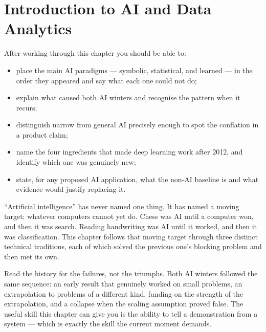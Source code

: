 
    \chapter{Introduction to AI and Data Analytics}

\label{ch:introduction}

\begin{learningobjectives}
After working through this chapter you should be able to:
\begin{itemize}
  \item place the main AI paradigms --- symbolic, statistical, and learned ---
        in the order they appeared and say what each one could not do;
  \item explain what caused both AI winters and recognise the pattern when it
        recurs;
  \item distinguish narrow from general AI precisely enough to spot the
        conflation in a product claim;
  \item name the four ingredients that made deep learning work after 2012, and
        identify which one was genuinely new;
  \item state, for any proposed AI application, what the non-AI baseline is and
        what evidence would justify replacing it.
\end{itemize}
\end{learningobjectives}

\begin{plainlanguage}
``Artificial intelligence'' has never named one thing. It has named a moving
target: whatever computers cannot yet do. Chess was AI until a computer won,
and then it was search. Reading handwriting was AI until it worked, and then it
was classification. This chapter follows that moving target through three
distinct technical traditions, each of which solved the previous one's blocking
problem and then met its own.
\end{plainlanguage}

\begin{engineernote}
Read the history for the failures, not the triumphs. Both AI winters followed
the same sequence: an early result that genuinely worked on small problems, an
extrapolation to problems of a different kind, funding on the strength of the
extrapolation, and a collapse when the scaling assumption proved false. The
useful skill this chapter can give you is the ability to tell a demonstration
from a system --- which is exactly the skill the current moment demands.
\end{engineernote}

